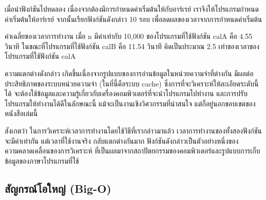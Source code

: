เมื่อ{\wbr}นำ{\wbr}ฟังก์ชัน{\wbr}ไป{\wbr}ทดลอง เนื่องจาก{\wbr}ต้อง{\wbr}มี{\wbr}การ{\wbr}กำหนด{\wbr}ค่า{\wbr}เริ่มต้น{\wbr}ให้{\wbr}กับ{\wbr}อาร์เรย์
เรา{\wbr}จึง{\wbr}ให้{\wbr}โปรแกรม{\wbr}กำหนด{\wbr}ค่า{\wbr}เริ่มต้น{\wbr}ให้{\wbr}อาร์เรย์ จากนั้น{\wbr}เรียก{\wbr}ฟังก์ชัน{\wbr}ดังกล่าว 10 รอบ{\wbr}
เพื่อ{\wbr}ลด{\wbr}ผล{\wbr}ของ{\wbr}เวลา{\wbr}จาก{\wbr}การ{\wbr}กำหนด{\wbr}ค่า{\wbr}เริ่มต้น{\wbr}

ค่าเฉลี่ย{\wbr}ของ{\wbr}เวลา{\wbr}การ{\wbr}ทำงาน เมื่อ {\ct n} มี{\wbr}ค่า{\wbr}เท่า{\wbr}กับ 10,000 ของ{\wbr}โปรแกรม{\wbr}ที่{\wbr}ใช้{\wbr}ฟังก์ชัน{\wbr}
{\ct calA} คือ 4.55 วินาที ใน{\wbr}ขณะที่{\wbr}โปรแกรม{\wbr}ที่{\wbr}ใช้{\wbr}ฟังก์ชัน {\ct calB} คือ 11.54 วินาที{\wbr}
คิด{\wbr}เป็น{\wbr}ประมาณ 2.5 เท่า{\wbr}ของ{\wbr}เวลา{\wbr}ของ{\wbr}โปรแกรม{\wbr}ที่{\wbr}ใช้{\wbr}ฟังก์ชัน {\ct calA}

ความ{\wbr}แตกต่าง{\wbr}ดังกล่าว เกิด{\wbr}ขึ้น{\wbr}เนื่องจาก{\wbr}รูปแบบ{\wbr}ของ{\wbr}การ{\wbr}อ่าน{\wbr}ข้อมูล{\wbr}ใน{\wbr}หน่วยความจำ{\wbr}ที่{\wbr}ต่าง{\wbr}กัน{\wbr}
มี{\wbr}ผล{\wbr}ต่อ{\wbr}ประสิทธิภาพ{\wbr}ของ{\wbr}ระบบ{\wbr}หน่วยความจำ (ใน{\wbr}ที่นี้{\wbr}คือ{\wbr}ระบบ cache)
ซึ่ง{\wbr}การ{\wbr}ที่{\wbr}จะ{\wbr}วิเคราะห์{\wbr}ให้{\wbr}ละเอียด{\wbr}ระดับ{\wbr}นี้{\wbr}ได้{\wbr}
จะ{\wbr}ต้อง{\wbr}ใช้{\wbr}ข้อมูล{\wbr}และ{\wbr}ความ{\wbr}รู้{\wbr}เกี่ยวกับ{\wbr}เครื่อง{\wbr}คอมพิวเตอร์{\wbr}ที่{\wbr}จะ{\wbr}นำ{\wbr}โปรแกรม{\wbr}ไป{\wbr}ทำงาน{\wbr}
และ{\wbr}การ{\wbr}ปรับ{\wbr}โปรแกรม{\wbr}ให้{\wbr}ทำงาน{\wbr}ได้{\wbr}ดี{\wbr}ใน{\wbr}ลักษณะ{\wbr}นี้ แม้{\wbr}จะ{\wbr}เป็น{\wbr}งาน{\wbr}เชิง{\wbr}วิศวกรรม{\wbr}ที่{\wbr}น่า{\wbr}สนใจ{\wbr}
แต่{\wbr}ก็{\wbr}อยู่{\wbr}นอก{\wbr}ขอบเขต{\wbr}ของ{\wbr}หนังสือ{\wbr}เล่ม{\wbr}นี้{\wbr}

สังเกต{\wbr}ว่า ใน{\wbr}การ{\wbr}วิเคราะห์{\wbr}เวลา{\wbr}การ{\wbr}ทำงาน{\wbr}โดย{\wbr}ใช้{\wbr}วิธี{\wbr}ที่{\wbr}เรา{\wbr}กล่าว{\wbr}มา{\wbr}แล้ว{\wbr}
เวลา{\wbr}การ{\wbr}ทำงาน{\wbr}ของ{\wbr}ทั้ง{\wbr}สอง{\wbr}ฟังก์ชัน{\wbr}จะ{\wbr}มี{\wbr}ค่า{\wbr}เท่า{\wbr}กัน แต่{\wbr}เวลา{\wbr}ที่{\wbr}ใช้{\wbr}งาน{\wbr}จริง กลับ{\wbr}แตกต่าง{\wbr}กัน{\wbr}มาก{\wbr}
ฟังก์ชัน{\wbr}ดังกล่าว{\wbr}เป็น{\wbr}ตัวอย่าง{\wbr}หนึ่ง{\wbr}ของ{\wbr}ความ{\wbr}คลาดเคลื่อน{\wbr}ของ{\wbr}การ{\wbr}วิเคราะห์{\wbr}
ที่{\wbr}เป็น{\wbr}ผล{\wbr}มา{\wbr}จาก{\wbr}สถาปัตยกรรม{\wbr}ของ{\wbr}คอมพิวเตอร์{\wbr}และ{\wbr}รูปแบบ{\wbr}การ{\wbr}เก็บ{\wbr}ข้อมูล{\wbr}ของ{\wbr}ภาษา{\wbr}โปรแกรม{\wbr}ที่{\wbr}ใช้{\wbr}

\subsection{สัญกรณ์โอ{\wbr}ใหญ่ (Big-O)}
\label{sect:analysis-big-o-definition}

